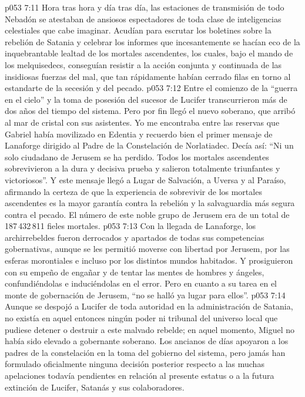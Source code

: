 \vs p053 7:11 Hora tras hora y día tras día, las estaciones de transmisión de todo Nebadón se atestaban de ansiosos espectadores de toda clase de inteligencias celestiales que cabe imaginar. Acudían para escrutar los boletines sobre la rebelión de Satania y celebrar los informes que incesantemente se hacían eco de la inquebrantable lealtad de los mortales ascendentes, los cuales, bajo el mando de los melquisedecs, conseguían resistir a la acción conjunta y continuada de las insidiosas fuerzas del mal, que tan rápidamente habían cerrado filas en torno al estandarte de la secesión y del pecado.
\vs p053 7:12 Entre el comienzo de la “guerra en el cielo” y la toma de posesión del sucesor de Lucifer transcurrieron más de dos años del tiempo del sistema. Pero por fin llegó el nuevo soberano, que arribó al mar de cristal con sus asistentes. Yo me encontraba entre las reservas que Gabriel había movilizado en Edentia y recuerdo bien el primer mensaje de Lanaforge dirigido al Padre de la Constelación de Norlatiadec. Decía así: “Ni un solo ciudadano de Jerusem se ha perdido. Todos los mortales ascendentes sobrevivieron a la dura y decisiva prueba y salieron totalmente triunfantes y victoriosos”. Y este mensaje llegó a Lugar de Salvación, a Uversa y al Paraíso, afirmando la certeza de que la experiencia de sobrevivir de los mortales ascendentes es la mayor garantía contra la rebelión y la salvaguardia más segura contra el pecado. El número de este noble grupo de Jerusem era de un total de 187\,432\,811 fieles mortales.
\vs p053 7:13 \pc Con la llegada de Lanaforge, los archirrebeldes fueron derrocados y apartados de todas sus competencias gobernativas, aunque se les permitió moverse con libertad por Jerusem, por las esferas morontiales e incluso por los distintos mundos habitados. Y prosiguieron con su empeño de engañar y de tentar las mentes de hombres y ángeles, confundiéndolas e induciéndolas en el error. Pero en cuanto a su tarea en el monte de gobernación de Jerusem, “no se halló ya lugar para ellos”.
\vs p053 7:14 \pc Aunque se despojó a Lucifer de toda autoridad en la administración de Satania, no existía en aquel entonces ningún poder ni tribunal del universo local que pudiese detener o destruir a este malvado rebelde; en aquel momento, Miguel no había sido elevado a gobernante soberano. Los ancianos de días apoyaron a los padres de la constelación en la toma del gobierno del sistema, pero jamás han formulado oficialmente ninguna decisión posterior respecto a las muchas apelaciones todavía pendientes en relación al presente estatus o a la futura extinción de Lucifer, Satanás y sus colaboradores.
